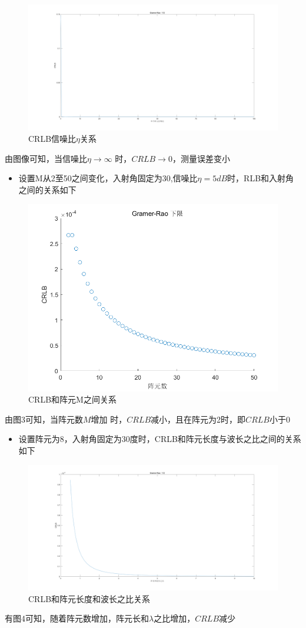 \documentclass{article}
\begin{document}
\begin{figure}
	\centering
	\includegraphics[width=0.75\linewidth]{CRLB 信噪比eta.png}
	\caption{CRLB信噪比$\eta$关系}

\end{figure}
由图像可知，当信噪比$\eta \to \infty$ 时，$CRLB \to 0$，测量误差变小
\begin{itemize}
	\item 设置M从2至50之间变化，入射角固定为30,信噪比$\eta =5dB$时，RLB和入射角之间的关系如下
\end{itemize}
\begin{figure}
	\centering
	\includegraphics[width=0.75\linewidth]{CRLB 阵元数.png}
	\caption{CRLB和阵元M之间关系}


\end{figure}
由图3可知，当阵元数$M$增加 时，$CRLB$减小，且在阵元为2时，即$CRLB$小于0
\begin{itemize}
	\item 设置阵元为8，入射角固定为30度时，CRLB和阵元长度与波长之比之间的关系如下
\end{itemize}
\begin{figure}
	\centering
	\includegraphics[width=0.75\linewidth]{CRLB 波长比.png}
	\caption{CRLB和阵元长度和波长之比关系}


\end{figure}
有图4可知，随着阵元数增加，阵元长和$\lambda$之比增加，$CRLB减少$
\end{document}
